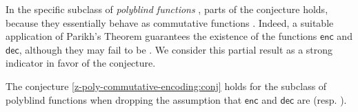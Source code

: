 In the specific subclass of \emph{polyblind functions}
\cite{nguyn21comparison,doueneau2022hiding}, parts of the conjecture holds,
because they essentially behave as commutative functions \cite[Theorem
6.12]{gaetanphd}. Indeed, a suitable application of Parikh's Theorem
\cite{parikh66context} guarantees the existence of the functions $\mathsf{enc}$
and $\mathsf{dec}$, although they may fail to be  .
We consider this partial result as a strong indicator in favor of the
conjecture.

\begin{remark}
    \label{z-poly-commutative-encoding:remark}
    The conjecture \cref{z-poly-commutative-encoding:conj} holds for the
    subclass of polyblind functions when dropping the assumption that
    $\mathsf{enc}$ and $\mathsf{dec}$ are 
    (resp. ).
\end{remark}
